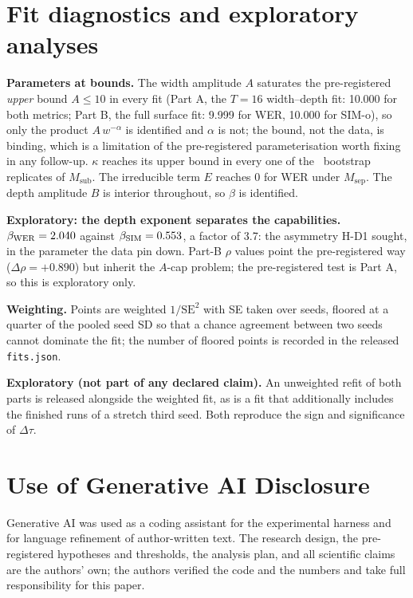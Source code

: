 \documentclass{article}
\begin{document}
\section{Fit diagnostics and exploratory analyses}
\label{app:diag}
\textbf{Parameters at bounds.} The width amplitude $A$ saturates the pre-registered
\emph{upper} bound $A \le 10$ in every fit (Part A, the $T{=}16$ width--depth fit: 10.000 for both metrics; Part B, the full surface fit: 9.999
for WER, 10.000 for SIM-o), so only the product $A\,w^{-\alpha}$ is identified and
$\alpha$ is not; the bound, not the data, is binding, which is a limitation of the
pre-registered parameterisation worth fixing in any follow-up. $\kappa$ reaches its upper
bound in every one of the \Nbootreps\ bootstrap replicates of $M_{\mathrm{sub}}$. The
irreducible term $E$ reaches 0 for WER under $M_{\mathrm{sep}}$. The depth amplitude $B$ is
interior throughout, so $\beta$ is identified.

\textbf{Exploratory: the depth exponent separates the capabilities.}
$\beta_{\mathrm{WER}} = 2.040$ against $\beta_{\mathrm{SIM}} = 0.553$, a factor
of 3.7: the asymmetry H-D1 sought, in the parameter the data pin down. Part-B $\rho$
values point the pre-registered way ($\Delta\rho = +0.890$) but inherit the $A$-cap
problem; the pre-registered test is Part A, so this is exploratory only.

\textbf{Weighting.} Points are weighted $1/\mathrm{SE}^2$ with SE taken over seeds, floored
at a quarter of the pooled seed SD so that a chance agreement between two seeds cannot
dominate the fit; the number of floored points is recorded in the released
\texttt{fits.json}.

\textbf{Exploratory (not part of any declared claim).} An unweighted refit of both parts is
released alongside the weighted fit, as is a fit that additionally includes the finished
runs of a stretch third seed. Both reproduce the sign and significance of $\Delta\tau$.

\section*{Use of Generative AI Disclosure}
Generative AI was used as a coding assistant for the experimental harness and for language
refinement of author-written text. The research design, the pre-registered hypotheses and
thresholds, the analysis plan, and all scientific claims are the authors' own; the authors
verified the code and the numbers and take full responsibility for this paper.
\end{document}
